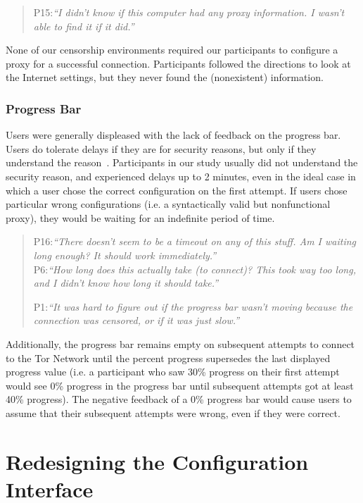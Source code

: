\documentclass[USenglish,oneside,twocolumn]{article}
\begin{document}
\begin{quotation}
\noindent P15:\textit{``I didn't know if this computer had any proxy information. I wasn't able to find it if it did.''}
\end{quotation}

None of our censorship environments required our participants to configure a proxy for a successful connection. Participants followed the directions to look at the Internet settings, but they never found the (nonexistent) information.

\subsubsection{Progress Bar} 
Users were generally displeased with the lack of feedback on the progress bar. Users do tolerate delays if they are for security reasons, but only if they understand the reason~\cite{egelmanplease}. Participants in our study usually did not understand the security reason, and experienced delays up to 2 minutes, even in the ideal case in which a user chose the correct configuration on the first attempt. If users chose particular wrong configurations (i.e. a syntactically valid but nonfunctional proxy), they would be waiting for an indefinite period of time. 

\begin{quotation}
\noindent P16:\textit{``There doesn't seem to be a timeout on any of this stuff. Am I waiting long enough? It should work immediately.''}\\

\noindent P6:\textit{``How long does this actually take (to connect)? This took way too long, and I didn't know how long it should take.''}

\noindent P1:\textit{``It was hard to figure out if the progress bar wasn't moving because the connection was censored, or if it was just slow.''}
\end{quotation}

Additionally, the progress bar remains empty on subsequent attempts to connect to the Tor Network until the percent progress supersedes the last displayed progress value (i.e. a participant who saw 30\% progress on their first attempt would see 0\% progress in the progress bar until subsequent attempts got at least 40\% progress). The negative feedback of a 0\% progress bar would cause users to assume that their subsequent attempts were wrong, even if they were correct. 

\section{Redesigning the Configuration Interface}
\end{document}
